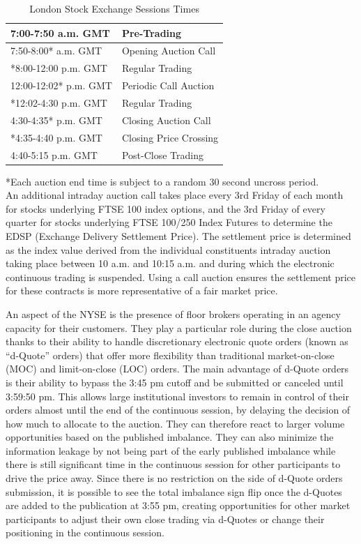 	\begin{table}[!ht]
  	\centering
   	\caption{London Stock Exchange Sessions Times\label{tab:LSEclose}}
   	\begin{tabular}{ll} 
	7:00-7:50 a.m. GMT & Pre-Trading  \\ \hline
	7:50-8:00* a.m. GMT & Opening Auction Call\\ \hline
	*8:00-12:00 p.m. GMT & Regular Trading \\ \hline
	12:00-12:02* p.m. GMT & Periodic Call Auction \\ \hline
	*12:02-4:30 p.m. GMT & Regular Trading \\ \hline
	4:30-4:35* p.m. GMT & Closing Auction Call \\ \hline
	*4:35-4:40 p.m. GMT & Closing Price Crossing \\ \hline	
	4:40-5:15 p.m. GMT & Post-Close Trading
   	\end{tabular}
	\begin{minipage}[t]{1\textwidth}
	\small{*Each auction end time is subject to a random 30 second uncross period.\\}
	\small{An additional intraday auction call takes place every 3rd Friday of each month for stocks underlying FTSE 100 index options, and the 3rd Friday of every quarter for stocks underlying FTSE 100/250 Index Futures to determine the EDSP (Exchange Delivery Settlement Price). The settlement price is determined as the index value derived from the individual constituents intraday auction taking place between 10 a.m. and 10:15 a.m. and during which the electronic continuous trading is suspended. Using a call auction ensures the settlement price for these contracts is more representative of a fair market price.}
	\end{minipage}   
	\end{table}	

An aspect of the NYSE is the presence of floor brokers operating in an agency capacity for their customers. They play a particular role during the close auction thanks to their ability to handle discretionary electronic quote orders (known as ``d-Quote'' orders) that offer more flexibility than traditional market-on-close (MOC) and limit-on-close (LOC) orders. The main advantage of d-Quote orders is their ability to bypass the 3:45 pm cutoff and be submitted or canceled until 3:59:50 pm. This allows large institutional investors to remain in control of their orders almost until the end of the continuous session, by delaying the decision of how much to allocate to the auction. They can therefore react to larger volume opportunities based on the published imbalance. They can also minimize the information leakage by not being part of the early published imbalance while there is still significant time in the continuous session for other participants to drive the price away.  Since there is no restriction on the side of d-Quote orders submission, it is possible to see the total imbalance sign flip once the d-Quotes are added to the publication at 3:55 pm, creating opportunities for other market participants to adjust their own close trading via d-Quotes or change their positioning in the continuous session. \twomedskip



